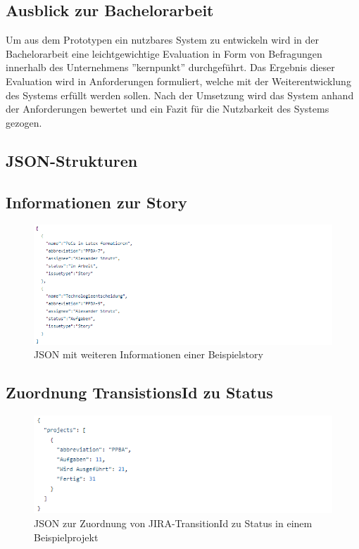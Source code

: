 \documentclass[12pt,titlepage]{scrartcl}
\begin{document}
	\subsection{Ausblick zur Bachelorarbeit}
	Um aus dem Prototypen ein nutzbares System zu entwickeln wird in der Bachelorarbeit eine leichtgewichtige Evaluation in Form von Befragungen innerhalb des Unternehmens ''kernpunkt'' durchgeführt. Das Ergebnis dieser Evaluation wird in Anforderungen formuliert, welche mit der Weiterentwicklung des Systems erfüllt werden sollen. Nach der Umsetzung wird das System anhand der Anforderungen bewertet und ein Fazit für die Nutzbarkeit des Systems gezogen. 
	\newpage
 	\begin{appendix}
 		\section{JSON-Strukturen} \label{ANHJSON}
 	  		\subsection{Informationen zur Story} \label{ANHInfStory}
 	  			\begin{figure}[H] 
  					\centering
    				\includegraphics[height=0.35\textheight]{infoStory}
  					\caption{JSON mit weiteren Informationen einer Beispielstory}
  					\label{fig:infoStory}
				\end{figure}
 	  		\subsection{Zuordnung TransistionsId zu Status} \label{ANHTransi}
 	  			\begin{figure}[H] 
  					\centering
    				\includegraphics[height=0.25\textheight]{uidUsername}
  					\caption{JSON zur Zuordnung von JIRA-TransitionId zu Status in einem Beispielprojekt}
  					\label{fig:uidUsername}
				\end{figure}

\end{appendix}
\end{document}
